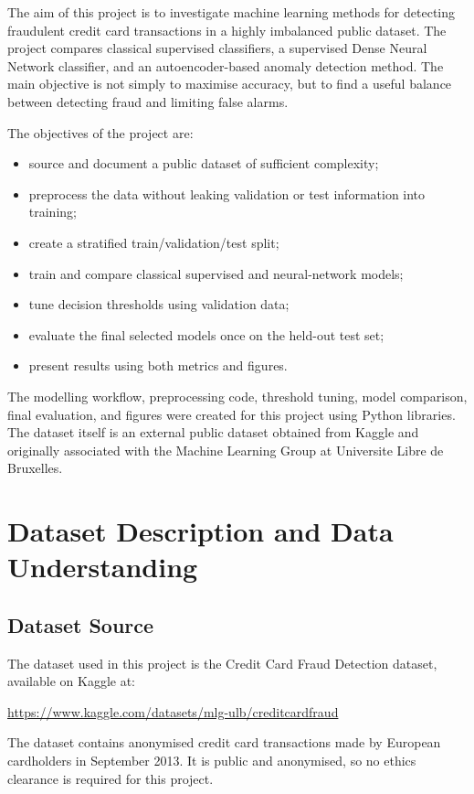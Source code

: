 \documentclass[12pt,a4paper]{report}
\begin{document}
The aim of this project is to investigate machine learning methods for detecting fraudulent credit card transactions in a highly imbalanced public dataset. The project compares classical supervised classifiers, a supervised Dense Neural Network classifier, and an autoencoder-based anomaly detection method. The main objective is not simply to maximise accuracy, but to find a useful balance between detecting fraud and limiting false alarms.

The objectives of the project are:

\begin{itemize}
    \item source and document a public dataset of sufficient complexity;
    \item preprocess the data without leaking validation or test information into training;
    \item create a stratified train/validation/test split;
    \item train and compare classical supervised and neural-network models;
    \item tune decision thresholds using validation data;
    \item evaluate the final selected models once on the held-out test set;
    \item present results using both metrics and figures.
\end{itemize}

The modelling workflow, preprocessing code, threshold tuning, model comparison, final evaluation, and figures were created for this project using Python libraries. The dataset itself is an external public dataset obtained from Kaggle and originally associated with the Machine Learning Group at Universite Libre de Bruxelles.

\chapter{Dataset Description and Data Understanding}

\section{Dataset Source}

The dataset used in this project is the Credit Card Fraud Detection dataset, available on Kaggle at:

\url{https://www.kaggle.com/datasets/mlg-ulb/creditcardfraud}

The dataset contains anonymised credit card transactions made by European cardholders in September 2013. It is public and anonymised, so no ethics clearance is required for this project.
\end{document}
